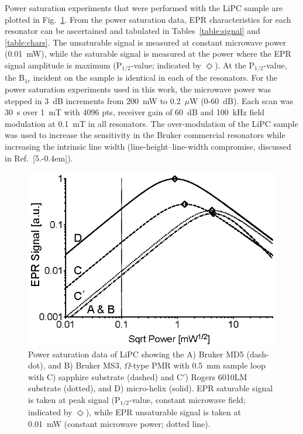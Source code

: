 Power saturation experiments that were performed with the LiPC sample are plotted in Fig.~\ref{fig:lipcpwrsat}. From the power saturation data, EPR characteristics for each resonator can be ascertained and tabulated in Tables~\ref{table:signal} and \ref{table:chars}. The unsaturable signal is measured at constant microwave power (0.01~mW), while the saturable signal is measured at the power where the EPR signal amplitude is maximum (P$_{1/2}$-value; indicated by $\Diamond$). At the P$_{1/2}$-value, the B$_{1r}$ incident on the sample is identical in each of the resonators. For the power saturation experiments used in this work, the microwave power was stepped in 3~dB increments from 200~mW to 0.2~$\mu$W (0-60~dB). Each scan was 30~s over 1~mT with 4096 pts, receiver gain of 60~dB and 100~kHz field modulation at 0.1~mT in all resonators. The over-modulation of the LiPC sample was used to increase the sensitivity in the Bruker commercial resonators while increasing the intrinsic line width (line-height--line-width compromise, discussed in Ref.~[5.\kern-0.4em]). 

\begin{figure}[htb]
\centering
\includegraphics{Kapitel/Appendix/Images/S4-LiPCPowerSat.eps}
\caption[Power saturation data of LiPC comparing resonators.]{Power saturation data of LiPC showing the A) Bruker MD5 (dash-dot), and B) Bruker MS3, $\Omega$-type PMR with 0.5~mm sample loop with C) sapphire substrate (dashed) and C$'$) Rogers 6010LM substrate (dotted), and D) micro-helix (solid). EPR saturable signal is taken at peak signal (P$_{1/2}$-value, constant microwave field; indicated by $\Diamond$), while EPR unsaturable signal is taken at 0.01~mW (constant microwave power; dotted line).}
\label{fig:lipcpwrsat}
\end{figure}

